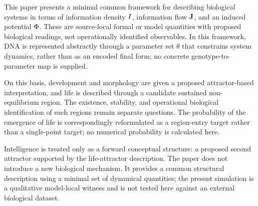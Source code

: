 This paper presents a minimal common framework for describing biological systems in terms of information density \(I\), information flow \(\mathbf{J}\), and an induced potential \(\Phi\). These are source-local formal or model quantities with proposed biological readings, not operationally identified observables. In this framework, DNA is represented abstractly through a parameter set \(\theta\) that constrains system dynamics, rather than as an encoded final form; no concrete genotype-to-parameter map is supplied.

On this basis, development and morphology are given a proposed attractor-based interpretation, and life is described through a candidate sustained non-equilibrium region. The existence, stability, and operational biological identification of such regions remain separate questions. The probability of the emergence of life is correspondingly reformulated as a region-entry target rather than a single-point target; no numerical probability is calculated here.

Intelligence is treated only as a forward conceptual structure: a proposed second attractor supported by the life-attractor description. The paper does not introduce a new biological mechanism. It provides a common structural description using a minimal set of dynamical quantities; the present simulation is a qualitative model-local witness and is not tested here against an external biological dataset.
